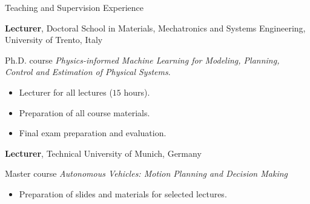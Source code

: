 \begin{rubric}{Teaching and Supervision Experience}
%

%
\entry*[06/2026]%
	\textbf{Lecturer}, Doctoral School in Materials, Mechatronics and Systems Engineering, University of Trento, Italy
    \par Ph.D. course \textit{Physics-informed Machine Learning for Modeling, Planning, Control and Estimation of Physical Systems}.
    \vspace{-0.3cm}
    \begin{itemize}
        \item Lecturer for all lectures ($15$ hours).\vspace{-0.35cm}
        \item Preparation of all course materials.\vspace{-0.35cm}
        \item Final exam preparation and evaluation.
    \end{itemize}
%
\entry*[07/2025 -- present]%
	\textbf{Lecturer}, Technical University of Munich, Germany
    \par Master course \textit{Autonomous Vehicles: Motion Planning and Decision Making}
    \vspace{-0.3cm}
    \begin{itemize}
        \item Preparation of slides and materials for selected lectures.\vspace{-0.35cm}

\end{itemize}
\end{rubric}
